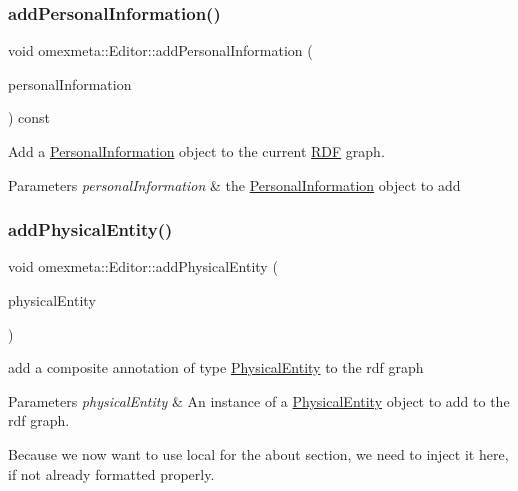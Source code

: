 \subsubsection{\texorpdfstring{add\+Personal\+Information()}{addPersonalInformation()}\hspace{0.1cm}{\footnotesize\ttfamily [2/2]}}
{\footnotesize\ttfamily void omexmeta\+::\+Editor\+::add\+Personal\+Information (\begin{DoxyParamCaption}\item[{\hyperlink{classomexmeta_1_1PersonalInformation}{Personal\+Information} $\ast$}]{personal\+Information }\end{DoxyParamCaption}) const}



Add a \hyperlink{classomexmeta_1_1PersonalInformation}{Personal\+Information} object to the current \hyperlink{classomexmeta_1_1RDF}{R\+DF} graph. 


\begin{DoxyParams}{Parameters}
{\em personal\+Information} & the \hyperlink{classomexmeta_1_1PersonalInformation}{Personal\+Information} object to add \\
\hline
\end{DoxyParams}
\mbox{\label{classomexmeta_1_1Editor_a0740831baafe244374ad7a324d51a87e}} 
\subsubsection{\texorpdfstring{add\+Physical\+Entity()}{addPhysicalEntity()}}
{\footnotesize\ttfamily void omexmeta\+::\+Editor\+::add\+Physical\+Entity (\begin{DoxyParamCaption}\item[{\hyperlink{classomexmeta_1_1PhysicalEntity}{Physical\+Entity} \&}]{physical\+Entity }\end{DoxyParamCaption})}



add a composite annotation of type \hyperlink{classomexmeta_1_1PhysicalEntity}{Physical\+Entity} to the rdf graph 


\begin{DoxyParams}{Parameters}
{\em physical\+Entity} & An instance of a \hyperlink{classomexmeta_1_1PhysicalEntity}{Physical\+Entity} object to add to the rdf graph. \\
\hline
\end{DoxyParams}
Because we now want to use  local for the about section, we need to inject it here, if not already formatted properly.\mbox{\label{classomexmeta_1_1Editor_a7833e03995f6323109c2db8d59104f6c}} 
